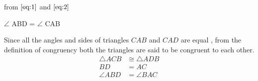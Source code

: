 \documentclass{article}
\begin{document}
from $\eqref{eq:1}$ and $\eqref{eq:2}$
\begin{center}
$\angle$ ABD = $\angle$ CAB 
\end{center}
Since all the angles and sides of triangles $CAB$ and $CAD$ are equal , from the definition of congruency both the triangles are said to be congruent to each other.
\begin{align}
    \triangle{ACB} & \cong \triangle{ADB}\\
    BD &= AC\\
    \angle{ABD} &= \angle{BAC}
\end{align}
\end{document}
